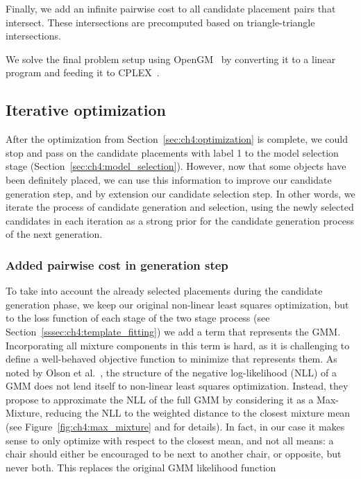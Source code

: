 \documentclass[10pt,twocolumn,letterpaper]{article}
\begin{document}
Finally, we add an infinite pairwise cost to all candidate placement pairs that
intersect. These intersections are precomputed based on triangle-triangle
intersections.

We solve the final problem setup using OpenGM~\cite{OpenGM} by converting it to
a linear program and feeding it to CPLEX~\cite{CPLEX}.

\subsection{Iterative optimization}
\label{sec:ch4:iteration}
After the optimization from Section~\ref{sec:ch4:optimization} is complete, we
could stop and pass on the candidate placements with label 1 to the model
selection stage (Section~\ref{sec:ch4:model_selection}).  However, now that
some objects have been definitely placed, we can use this information to
improve our candidate generation step, and by extension our candidate selection
step. In other words, we iterate the process of candidate generation and
selection, using the newly selected candidates in each iteration as a strong prior for the
candidate generation process of the next generation.

\subsubsection{Added pairwise cost in generation step}
To take into account the already selected placements during the candidate
generation phase, we keep our original non-linear least squares optimization,
but to the loss function of each stage of the two stage process (see
Section~\ref{sssec:ch4:template_fitting}) we add a term that represents the
GMM.  Incorporating all mixture components in this
term is hard, as it is challenging to define a well-behaved objective function to minimize that
represents them. As noted by Olson et al.~\cite{Olson:2013:IJRR}, the
structure of the negative log-likelihood (NLL) of a GMM does not lend itself to
non-linear least squares optimization. Instead, they propose to approximate the
NLL of the full GMM by considering it as a Max-Mixture, reducing the NLL to the
weighted distance to the closest mixture mean (see Figure~\ref{fig:ch4:max_mixture} and \cite{Olson:2013:IJRR} for
details).  In fact, in our case it makes sense to only optimize with respect to
the closest mean, and not all means: a chair should either be encouraged to be
next to another chair, or opposite, but never both. This replaces the original GMM likelihood function
\end{document}
